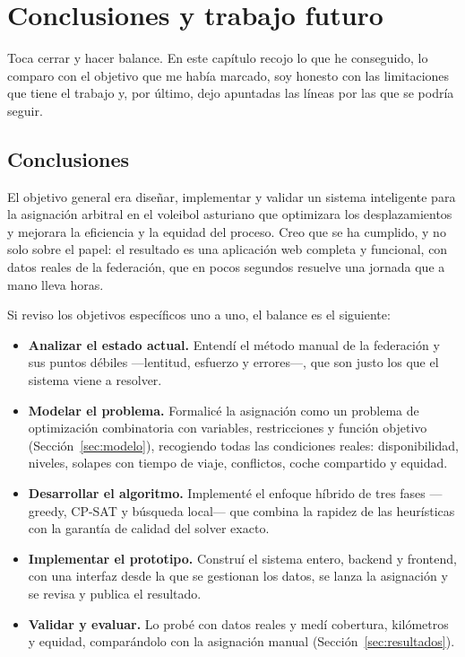 \documentclass[11pt,a4paper,spanish]{book}
\numberwithin{equation}{chapter}
\numberwithin{figure}{chapter}
\numberwithin{table}{chapter}
\begin{document}
\chapter{Conclusiones y trabajo futuro}
\label{cap:conclusiones}

Toca cerrar y hacer balance. En este capítulo recojo lo que he conseguido, lo comparo con el objetivo que me había marcado, soy honesto con las limitaciones que tiene el trabajo y, por último, dejo apuntadas las líneas por las que se podría seguir.

\section{Conclusiones}

El objetivo general era diseñar, implementar y validar un sistema inteligente para la asignación arbitral en el voleibol asturiano que optimizara los desplazamientos y mejorara la eficiencia y la equidad del proceso. Creo que se ha cumplido, y no solo sobre el papel: el resultado es una aplicación web completa y funcional, con datos reales de la federación, que en pocos segundos resuelve una jornada que a mano lleva horas.

Si reviso los objetivos específicos uno a uno, el balance es el siguiente:

\begin{itemize}
\item {\bf Analizar el estado actual.} Entendí el método manual de la federación y sus puntos débiles —lentitud, esfuerzo y errores—, que son justo los que el sistema viene a resolver.
\item {\bf Modelar el problema.} Formalicé la asignación como un problema de optimización combinatoria con variables, restricciones y función objetivo (Sección~\ref{sec:modelo}), recogiendo todas las condiciones reales: disponibilidad, niveles, solapes con tiempo de viaje, conflictos, coche compartido y equidad.
\item {\bf Desarrollar el algoritmo.} Implementé el enfoque híbrido de tres fases —greedy, CP-SAT y búsqueda local— que combina la rapidez de las heurísticas con la garantía de calidad del solver exacto.
\item {\bf Implementar el prototipo.} Construí el sistema entero, backend y frontend, con una interfaz desde la que se gestionan los datos, se lanza la asignación y se revisa y publica el resultado.
\item {\bf Validar y evaluar.} Lo probé con datos reales y medí cobertura, kilómetros y equidad, comparándolo con la asignación manual (Sección~\ref{sec:resultados}).
\end{itemize}
\end{document}

